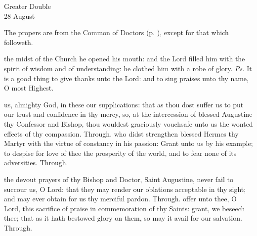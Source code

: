 \begin{inhead}
    {Greater Double\\
28 August}
\end{inhead}
\begin{rubric}
	The propers are from the Common of Doctors (p. \pageref{CommonDoctors}), except for that which followeth.
\end{rubric}

\introit
{} the midst of the Church he opened his mouth: and the Lord filled him with the spirit of wisdom and of understanding: he clothed him with a robe of glory. \textit{Ps.} It is a good thing to give thanks unto the Lord: and to sing praises unto thy name, O most Highest.

\collect
{} us, almighty God, in these our supplications: that as thou dost suffer us to put our trust and confidence in thy mercy, so, at the intercession of blessed Augustine thy Confessor and Bishop, thou wouldest graciously vouchsafe unto us the wonted effects of thy compassion. Through.
 who didst strengthen blessed Hermes thy Martyr with the virtue of constancy in his passion: Grant unto us by his example; to despise for love of thee the prosperity of the world, and to fear none of its adversities. Through.



\secret
{} the devout prayers of thy Bishop and Doctor, Saint Augustine, never fail to succour us, O Lord: that they may render our oblations acceptable in thy sight; and may ever obtain for us thy merciful pardon. Through.
 offer unto thee, O Lord, this sacrifice of praise in commemoration of thy Saints: grant, we beseech thee; that as it hath bestowed glory on them, so may it avail for our salvation. Through.


